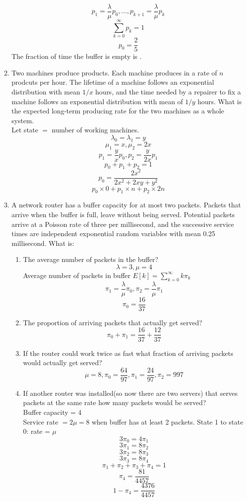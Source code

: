 \documentclass[10.5pt,letterpaper]{article}
\begin{document}
\begin{enumerate}[label=\textbf{Problem \arabic*.}]
\[p_1=\frac{\lambda}{\mu}p_0,\dots,p_{k+1}=\frac{\lambda}{\mu}p_k\]
\[\sum_{k=0}^{\infty}p_k=1\]
\[p_0 = \frac{2}{5}\]
The fraction of time the buffer is empty is .
\item Two machines produce products. Each machine produces in a rate of $n$ prodcuts per hour. The lifetime of a machine follows an exponential distribution with mean $1/x$ hours, and the time needed by a repairer to fix a machine follows an exponential distribution with mean of $1/y$ hours. What is the expected long-term producing rate for the two machines as a whole system.\\
Let state $= $ number of working machines.
\[\lambda_0=\lambda_1=y\]
\[\mu_1=x, \mu_2=2x\]
\[p_1=\frac{y}{x}p_0, p_2=\frac{y}{2x}p_1\]
\[p_0+p_1+p_2=1\]
\[p_0=\frac{2x^2}{2x^2+2xy+y^2}\]
\[\boxed{p_0\times0 + p_1\times n + p_2 \times 2n}\]
\item A network router has a buffer capacity for at most two packets. Packets that arrive when the buffer is full, leave without being served. Potential packets arrive at a Poisson rate of three per millisecond, and the successive service times are independent exponential random variables with mean 0.25 millisecond. What is:
	\begin{enumerate}[label=(\alph*)]
	\item The average number of packets in the buffer?
	\[\lambda=3,\mu=4\]
	Average number of packets in buffer $E[k]=\sum_{k=0}^{\infty}k\pi_k$
	\[\pi_1=\frac{\lambda}{\mu}\pi_0, \pi_2=\frac{\lambda}{\mu}\pi_1\]
	\[\boxed{\pi_0=\frac{16}{37}}\]
	\item  The proportion of arriving packets that actually get served?
	\[\boxed{\pi_0+\pi_1 = \frac{16}{37}+\frac{12}{37}}\]
	\item If the router could work twice as fast what fraction of arriving packets would actually get served?
	\[\boxed{\mu=8,\pi_0=\frac{64}{97},\pi_1=\frac{24}{97},\pi_2={9}{97}}\]
	\item  If another router was installed(so now there are two servers) that serves packets at the same rate how many packets would be served?\\
	Buffer capacity = 4\\
	Service rate $= 2\mu = 8$ when buffer has at least 2 packets.
	State 1 to state 0: rate = $\mu$
	\[3\pi_0 = 4\pi_1\]
	\[3\pi_1 = 8\pi_2\]
	\[3\pi_2 = 8\pi_3\]
	\[3\pi_3 = 8\pi_4\]
	\[\pi_1 + \pi_2 + \pi_3 + \pi_4 = 1\]
	\[\pi_4 = \frac{81}{4457}\]
	\[\boxed{1-\pi_4 = \frac{4376}{4457}}\]
	\end{enumerate}

\end{enumerate}
\end{document}
